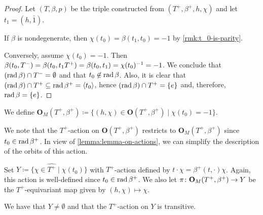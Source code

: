 \begin{proof}
    Let $(T, \beta, p)$ be the triple constructed from $(T^+, \beta^+, h, \chi)$ and let $t_1 = (h, \bar 1)$. 
    
    If $\beta$ is nondegenerate, then $\chi(t_0) = \beta(t_1, t_0) = -1$ by \cref{rmk:t_0-is-parity}. 
    
    Conversely, assume $\chi(t_0) = -1$. 
    Then $\beta(t_0, T^-) = \beta(t_0, t_1T^+) = \beta (t_0, t_1) = \chi(t_0)^{-1} = -1$. 
    We conclude that $(\operatorname{rad} \beta)\cap T^- = \emptyset$ and that $t_0 \not\in \operatorname{rad}\beta$. 
    Also, it is clear that $(\operatorname{rad} \beta)\cap T^+ \subseteq \operatorname{rad} \beta^+ = \langle t_0 \rangle$, hence $(\operatorname{rad} \beta)\cap T^+ = \{e\}$ and, therefore, $\operatorname{rad} \beta = \{e\}$.
\end{proof}

\begin{defi}\label{def:O_M}
    We define $\mathbf{O}_M(T^+, \beta^+) \coloneqq \{ (h, \chi) \in \mathbf{O}(T^+, \beta^+) \mid \chi(t_0) = -1 \}$.
\end{defi}



We note that the $T^+$-action on $\mathbf{O}(T^+, \beta^+)$ restricts to $\mathbf{O}_M(T^+, \beta^+)$ since $t_0\in \operatorname{rad} \beta^+$. 
In view of \cref{lemma:lemma-on-actions}, we can simplify the description of the orbits of this action. 

Set $Y \coloneqq \{\chi \in \widehat{T^+} \mid \chi (t_0)\}$ with $T^+$-action defined by $t\cdot \chi = \beta^+(t, \cdot) \chi$. 
Again, this action is well-defined since $t_0 \in \operatorname{rad} \beta^+$. 
We also let $\pi\colon \mathbf{O}_M(T^+, \beta^+) \to Y$ be the $T^+$-equivariant map given by $(h, \chi) \mapsto \chi$. 

\begin{lemma}
    We have that $Y \neq \emptyset$ and that the $T^+$-action on $Y$ is transitive.
\end{lemma}

